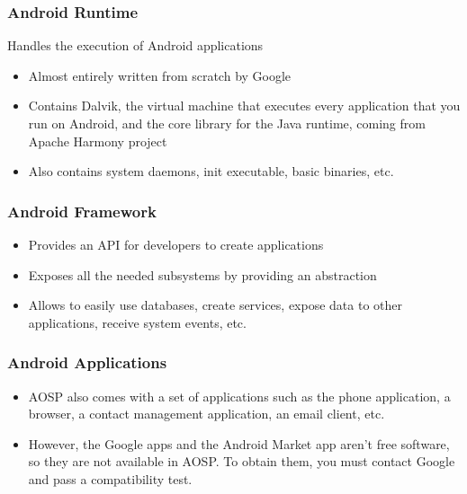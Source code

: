 \begin{frame}
  \frametitle{Android Runtime}
  Handles the execution of Android applications
  \begin{itemize}
  \item Almost entirely written from scratch by Google
  \item Contains Dalvik, the virtual machine that executes every
    application that you run on Android, and the core library for the
    Java runtime, coming from Apache Harmony project
  \item Also contains system daemons, init executable, basic binaries,
    etc.
  \end{itemize}
\end{frame}

\begin{frame}
  \frametitle{Android Framework}
  \begin{itemize}
  \item Provides an API for developers to create applications
  \item Exposes all the needed subsystems by providing an abstraction
  \item Allows to easily use databases, create services, expose data
    to other applications, receive system events, etc.
  \end{itemize}
\end{frame}

\begin{frame}
  \frametitle{Android Applications}
  \begin{itemize}
  \item AOSP also comes with a set of applications such as the phone
    application, a browser, a contact management application, an email
    client, etc.
  \item However, the Google apps and the Android Market app aren't free
    software, so they are not available in AOSP. To obtain them, you
    must contact Google and pass a compatibility test.
  \end{itemize}
\end{frame}

